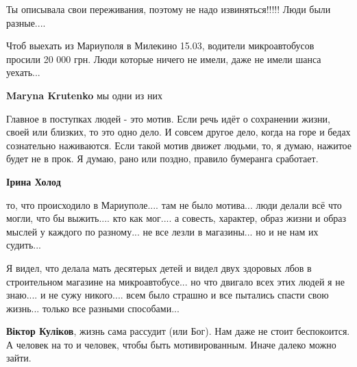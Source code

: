  
 
 
 
 

\qqSecCmt


Ты описывала свои переживания, поэтому не надо извиняться!!!!! Люди были разные....


Чтоб выехать из Мариуполя в Милекино 15.03, водители микроавтобусов просили 20
000 грн. Люди которые ничего не имели, даже не имели шанса уехать...

\begin{itemize} %
\textbf{Maryna Krutenko} мы одни из них
\end{itemize} %


Главное в поступках людей - это мотив. Если речь идёт о сохранении жизни, своей
или близких, то это одно дело. И совсем другое дело, когда на горе и бедах
сознательно наживаются. Если такой мотив движет людьми, то, я думаю, нажитое
будет не в прок. Я думаю, рано или поздно, правило бумеранга сработает.

\begin{itemize} %
\textbf{Ірина Холод} 

то, что происходило в Мариуполе.... там не было мотива... люди делали всё что
могли, что бы выжить.... кто как мог.... а совесть, характер, образ жизни и образ
мыслей у каждого по разному... не все лезли в магазины... но и не нам их
судить...

Я видел, что делала мать десятерых детей и видел двух здоровых лбов в
строительном магазине на микроавтобусе... но что двигало всех этих людей я не
знаю.... и не сужу никого.... всем было страшно и все пытались спасти свою
жизнь... только все разными способами...

\textbf{Віктор Куліков}, жизнь сама рассудит (или Бог). Нам даже не стоит беспокоится. А человек на то и человек, чтобы быть мотивированным. Иначе далеко можно зайти.
\end{itemize} %

